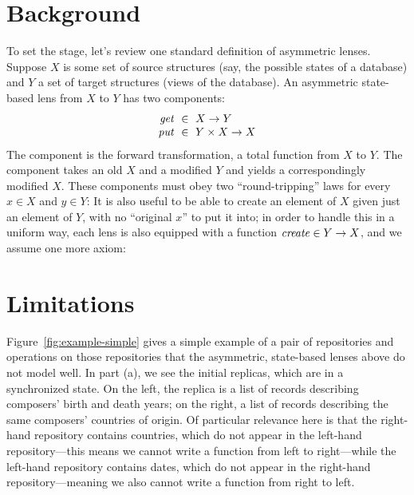 \section{Background}
\label{sec:background}
\newif \iftext  \texttrue
\newif \iffull  \fulltrue
\newif \ifdraft \draftfalse
\newif \ifdelta \deltafalse
\newif \iflater \laterfalse  %
\newif \iftikz  \tikztrue
To set the stage, let's review one standard definition of
asymmetric lenses.
%
Suppose $X$ is some set of source structures (say, the possible states of a
database) and $Y$ a set of target structures (views of the database).
%
An asymmetric state-based lens from $X$ to $Y$ has two components:
\[
\begin{array}{r@{\ \;}c@{\ \;}l}
\GET &\in& X \arrow Y\\
\PUT &\in& Y \times X \arrow X
\end{array}
\]
The \GET{} component is the forward transformation, a total function from
$X$ to $Y$.  The \PUT{} component takes an old $X$ and a modified $Y$ and
yields a correspondingly modified $X$.  These components
must obey two ``round-tripping'' laws for every $x \in X$ and $y
\in Y$:
%
%
It is also useful to be able to create an element of $X$ given just an
element of $Y$, with no ``original $x$'' to put it into; in order to handle
this in a
uniform way, each lens is also equipped with a
function $\mathit{create}\in Y\rightarrow X$, and we assume one more axiom:

\section{Limitations}
\label{sec:asymm-limitations}

Figure~\ref{fig:example-simple} gives a simple example of a pair of
repositories and operations on those repositories that the asymmetric,
state-based lenses above do not model well. In part (a),
we see the initial replicas, which are in a synchronized state.  On the
left, the replica is a list of records describing composers' birth and death
years; on the right, a list of records describing the same
composers' countries of origin. Of particular relevance here is that the
right-hand repository contains countries, which do not appear in the left-hand
repository---this means we cannot write a \GET{} function from
left to right---while the left-hand repository contains dates, which do not
appear in the right-hand repository---meaning we also cannot write a
\GET{} function from right to left.

